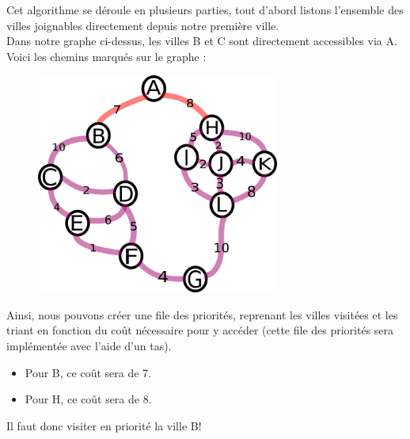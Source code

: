\documentclass[a4paper, 12pt]{article}
\numberwithin{equation}{subsection}
\begin{document}
Cet algorithme se déroule en plusieurs parties, tout d'abord listons l'ensemble des villes joignables directement depuis notre première ville. \\

Dans notre graphe ci-dessus, les villes B et C sont directement accessibles via A.\\

Voici les chemins marqués sur le graphe : \\
\begin{figure}[H]
  \centering
  \includegraphics[width=8.0cm]{imgs/second_search.png}
\end{figure}
Ainsi, nous pouvons créer une file des priorités, reprenant les villes visitées et les triant en fonction du coût nécessaire pour y accéder (cette file des priorités sera implémentée avec l'aide d'un tas). \\
\begin{itemize}
  \item Pour B, ce coût sera de 7.
  \item Pour H, ce coût sera de 8.
\end{itemize}
Il faut donc visiter en priorité la ville B! \\
\end{document}
